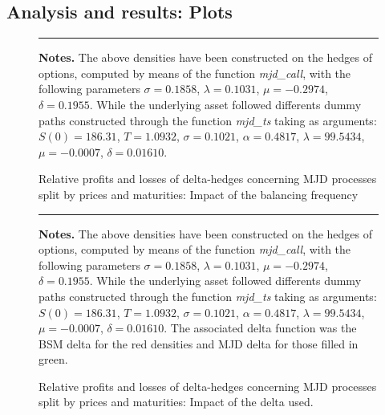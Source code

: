 \documentclass[12pt]{report}
\begin{document}

\begin{appendices}
\chapter{Analysis and results: Plots}
\label{cha:appendanalysis:plot}



\begin{figure}[h]
  \centering
  \rule{40mm}{20mm}
  \caption{Relative profits and losses of delta-hedges concerning MJD processes split by prices and maturities: Impact of the balancing frequency}
  \begin{changemargin}{0.5cm}{0.5cm}
  \medskip
\footnotesize
{}\textbf{Notes.} The above densities have been constructed on the hedges of options, computed by means of the function \textit{mjd\_call}, with the following parameters $\sigma = 0.1858$, $\lambda = 0.1031$, $\mu = -0.2974$, $\delta = 0.1955$. While the underlying asset followed differents dummy paths constructed through the function \textit{mjd\_ts} taking as arguments: $S(0) = 186.31$, $T = 1.0932$, $\sigma = 0.1021$, $\alpha = 0.4817$, $\lambda = 99.5434$, $\mu = -0.0007$, $\delta = 0.01610$. 
  \end{changemargin}
  \label{p:analysis:mjd:pl:dist:big}
\end{figure}




\begin{figure}[h]
  \centering
  \rule{40mm}{20mm}
  \caption{Relative profits and losses of delta-hedges concerning MJD processes split by prices and maturities: Impact of the delta used.}
  \begin{changemargin}{0.5cm}{0.5cm}
  \medskip
\footnotesize
{}\textbf{Notes.} The above densities have been constructed on the hedges of options, computed by means of the function \textit{mjd\_call}, with the following parameters $\sigma = 0.1858$, $\lambda = 0.1031$, $\mu = -0.2974$, $\delta = 0.1955$. While the underlying asset followed differents dummy paths constructed through the function \textit{mjd\_ts} taking as arguments: $S(0) = 186.31$, $T = 1.0932$, $\sigma = 0.1021$, $\alpha = 0.4817$, $\lambda = 99.5434$, $\mu = -0.0007$, $\delta = 0.01610$. The associated delta function was the BSM delta for the red densities and MJD delta for those filled in green.
  \end{changemargin}
  \label{p:analysis:mjd:pl:dist:deltas}
\end{figure}



\end{appendices}
\end{document}
